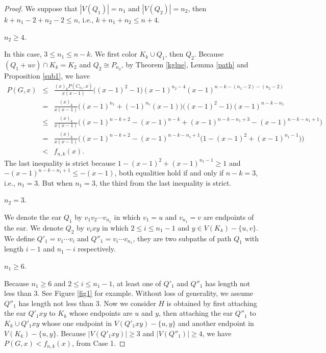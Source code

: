 \documentclass[12pt]{article}
\theoremstyle{definition}
\begin{document}
\begin{proof} We suppose that $|V(Q_1)|=n_1$ and $|V(Q_2)|=n_2$, then $k+n_1-2+n_2-2\leq n$, i.e., $k+n_1+n_2\leq n+4$.

 $n_2\geq 4$.

In this case, $3\leq n_1\leq n-k$. We first color $K_k\cup Q_1$, then $Q_2$. Because $(Q_1+uv)\cap K_k=K_2$ and $Q_2\cong P_{n_2}$, by Theorem \ref{kglue}, Lemma \ref{path} and Proposition \ref{sub1}, we have
\begin{eqnarray*}P(G,x)&\leq &\frac{(x)_kP(C_{n_1},x)}{x(x-1)}\big((x-1)^2-1\big)(x-1)^{n_2-4}(x-1)^{n-k-(n_1-2)-(n_2-2)}\\
&=&\frac{(x)_k}{x(x-1)}\big((x-1)^{n_1}+(-1)^{n_1}(x-1)\big)\big((x-1)^2-1\big)(x-1)^{n-k-n_1}\\
&\leq &\frac{(x)_k}{x(x-1)}\big((x-1)^{n-k+2}-(x-1)^{n-k}+(x-1)^{n-k-n_1+3}-(x-1)^{n-k-n_1+1}\big)\\
&=&\frac{(x)_k}{x(x-1)}\Big((x-1)^{n-k+2}-(x-1)^{n-k-n_1+1}\big(1-(x-1)^2+(x-1)^{n_1-1}\big)\Big)\\
&< &f_{n,k}(x).
\end{eqnarray*}
The last inequality is strict because $1-(x-1)^2+(x-1)^{n_1-1}\geq 1$ and $-(x-1)^{n-k-n_1+1}\leq-(x-1)$, both equalities hold if and only if $n-k=3$, i.e., $n_1=3$. But when $n_1=3$, the third from the last inequality is strict.



 $n_2=3$.

We denote the ear $Q_1$ by $v_1v_2\cdots v_{n_1}$ in which $v_1=u$ and $v_{n_1}=v$ are endpoints of the ear.  We denote $Q_2$ by $v_ixy$ in which $2\leq i\leq n_1-1$ and $y\in V(K_k)-\{u,v\}$. We define $Q'_1=v_1\cdots v_i$ and $Q''_1=v_i\cdots v_{n_1}$, they are two subpaths of path $Q_1$ with length $i-1$ and $n_1-i$ respectively.

 $n_1\geq 6$.


Because $n_1\geq 6$ and $2\leq i\leq n_1-1$, at least one of $Q'_1$ and $Q''_1$ has length not less than $3$. See Figure \ref{fig1} for example. Without loss of generality, we assume $Q''_1$ has length not less than $3$. Now we consider $H$ is obtained by first attaching the ear $Q'_1xy$ to $K_k$ whose endpoints are $u$ and  $y$, then attaching the ear $Q''_1$ to $K_k\cup Q'_1xy$ whose one endpoint in $V(Q'_1xy)-\{u,y\}$ and another endpoint in $V(K_k)-\{u,y\}$.  Because $|V(Q'_1xy)|\geq 3$ and $|V(Q''_1)|\geq 4$, we have $P(G,x)<f_{n,k}(x)$, from Case 1.



\end{proof}
\end{document}
